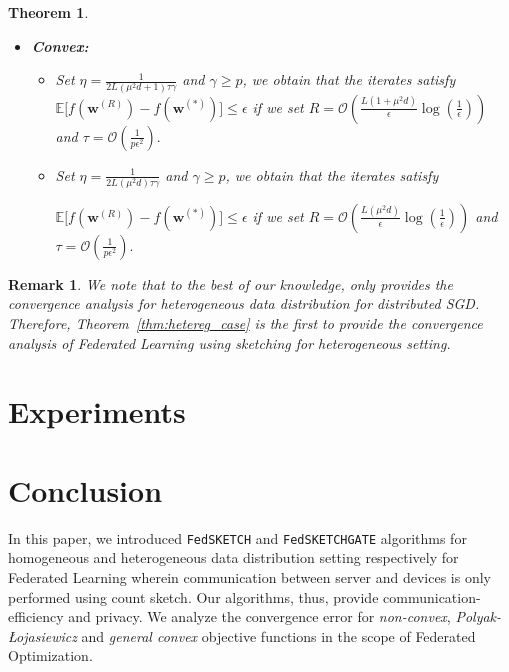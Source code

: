 \documentclass{article}
\newcommand{\pl}{Polyak-\L{}ojasiewicz}
\newtheorem{theorem}{Theorem}
\newtheorem{remark}{Remark}
\begin{document}
\begin{theorem}
\begin{itemize}
     \item \textbf{Convex:}
     \begin{itemize}
         \item [\texttt{PRIVIX}] Set $\eta=\frac{1}{2L\left(\mu^2d+1\right)\tau\gamma}$ and $\gamma\geq p$, we obtain that the iterates satisfy $ \mathbb{E}\Big[f({\boldsymbol{w}}^{(R)})-f({\boldsymbol{w}}^{(*)})\Big]\leq \epsilon$ if we set
     $R=\mathcal{O}\left(\frac{L\left(1+\mu^2d\right)}{\epsilon}\log\left(\frac{1}{\epsilon}\right)\right)$ and $ \tau=\mathcal{O}\left(\frac{1}{p\epsilon^2}\right).$
         \item [\texttt{HEAPRIX}] Set  $\eta=\frac{1}{2L\left(\mu^2d\right)\tau\gamma}$ and $\gamma\geq p$, we obtain that the iterates satisfy 
         
         $ \mathbb{E}\Big[f({\boldsymbol{w}}^{(R)})-f({\boldsymbol{w}}^{(*)})\Big]\leq \epsilon$ if we set
     $R=\mathcal{O}\left(\frac{L\left(\mu^2d\right)}{\epsilon}\log\left(\frac{1}{\epsilon}\right)\right)$ and $ \tau=\mathcal{O}\left(\frac{1}{p\epsilon^2}\right).$ 
     \end{itemize}
 \end{itemize}
\end{theorem}
\begin{remark}
We note that to the best of our knowledge, only \cite{li2019privacy} provides the convergence analysis for heterogeneous data distribution for distributed SGD. Therefore, Theorem~\ref{thm:hetereg_case} is the first to provide the convergence analysis of Federated Learning using sketching for heterogeneous setting.  
\end{remark}


\section{Experiments}


\section{Conclusion}\label{sec:conclusion}
In this paper, we introduced \texttt{FedSKETCH} and \texttt{FedSKETCHGATE} algorithms for homogeneous and heterogeneous data distribution setting respectively for Federated Learning wherein communication between server and devices is only performed using count sketch. 
Our algorithms, thus, provide communication-efficiency and privacy. 
We analyze the convergence error for \emph{non-convex}, \emph{\pl} and \emph{general convex} objective functions in the scope of Federated Optimization.     
\end{document}
